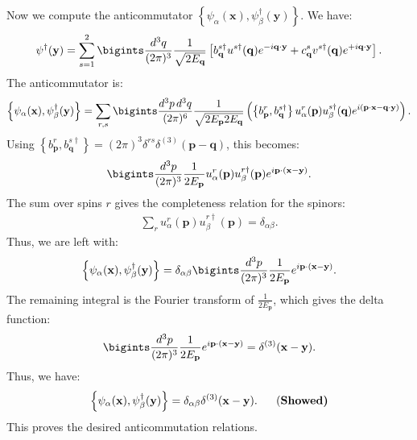 Now we compute the anticommutator $\left\{\psi_\alpha(\mathbf{x}), \psi^\dagger_\beta(\mathbf{y})\right\}$. We have:
\begin{align*}
    \psi^\dagger(\mathbf{y}) = \sum_{s=1}^2 \bigints\frac{d^3q}{(2\pi)^3} \frac{1}{\sqrt{2E_{\mathbf{q}}}} \left[ b^{s\dagger}_{\mathbf{q}} u^{s\dagger}(\mathbf{q}) e^{-i\mathbf{q}\cdot\mathbf{y}} + c^s_{\mathbf{q}} v^{s\dagger}(\mathbf{q}) e^{+i\mathbf{q}\cdot\mathbf{y}} \right].
\end{align*}
The anticommutator is:
\begin{align*}
    \left\{\psi_\alpha(\mathbf{x}), \psi^\dagger_\beta(\mathbf{y})\right\} = \sum_{r,s} \bigints\frac{d^3p \, d^3q}{(2\pi)^6} \frac{1}{\sqrt{2E_{\mathbf{p}} 2E_{\mathbf{q}}}} \left( \left\{b^r_{\mathbf{p}}, b^{s\dagger}_{\mathbf{q}}\right\} u^r_\alpha(\mathbf{p}) u^{s\dagger}_\beta(\mathbf{q}) e^{i(\mathbf{p}\cdot\mathbf{x} - \mathbf{q}\cdot\mathbf{y})} \right).
\end{align*}
Using $\left\{b^r_{\mathbf{p}}, b^{s\dagger}_{\mathbf{q}}\right\} = (2\pi)^3 \delta^{rs} \delta^{(3)}(\mathbf{p} - \mathbf{q})$, this becomes:
\begin{align*}
    \bigints\frac{d^3p}{(2\pi)^3} \frac{1}{2E_{\mathbf{p}}} u^r_\alpha(\mathbf{p}) u^{r\dagger}_\beta(\mathbf{p}) e^{i\mathbf{p}\cdot(\mathbf{x} - \mathbf{y})}.
\end{align*}
The sum over spins $r$ gives the completeness relation for the spinors:
\begin{align*}
    \sum_r u^r_\alpha(\mathbf{p}) u^{r\dagger}_\beta(\mathbf{p}) = \delta_{\alpha\beta}.
\end{align*}
Thus, we are left with:
\begin{align*}
    \left\{\psi_\alpha(\mathbf{x}), \psi^\dagger_\beta(\mathbf{y})\right\} = \delta_{\alpha\beta} \bigints\frac{d^3p}{(2\pi)^3} \frac{1}{2E_{\mathbf{p}}} e^{i\mathbf{p}\cdot(\mathbf{x} - \mathbf{y})}.
\end{align*}
The remaining integral is the Fourier transform of $\displaystyle\frac{1}{2E_{\mathbf{p}}}$, which gives the delta function:
\begin{align*}
    \bigints\frac{d^3p}{(2\pi)^3} \frac{1}{2E_{\mathbf{p}}} e^{i\mathbf{p}\cdot(\mathbf{x} - \mathbf{y})} = \delta^{(3)}(\mathbf{x} - \mathbf{y}).
\end{align*}
Thus, we have:
\begin{align}
    \left\{\psi_\alpha(\mathbf{x}), \psi^\dagger_\beta(\mathbf{y})\right\} = \delta_{\alpha\beta} \delta^{(3)}(\mathbf{x} - \mathbf{y}).~~~~~\text{(\bf Showed)}
\end{align}
This proves the desired anticommutation relations.

